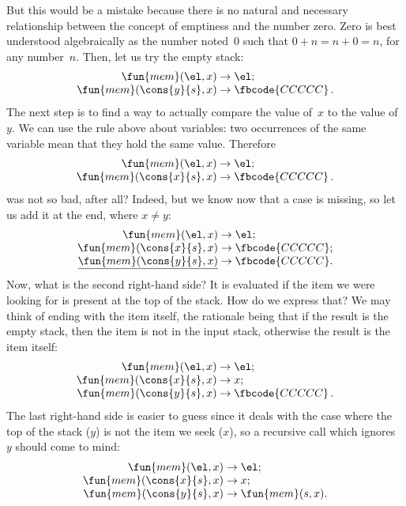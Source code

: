 But this would be a mistake because there is no natural and necessary
relationship between the concept of emptiness and the number
zero. Zero is best understood algebraically as the number noted~\(0\)
such that \(0 + n = n + 0 = n\), for any number~\(n\). Then, let us
try the empty stack:
\begin{equation*}
\begin{array}{r@{\;}c@{\;}l}
\fun{mem}(\el,x) & \rightarrow & \el;\\
\fun{mem}(\cons{y}{s},x) & \rightarrow & \fbcode{CCCCC}\,.
\end{array}
\end{equation*}
The next step is to find a way to actually compare the value of~\(x\)
to the value of~\(y\). We can use the rule above about variables: two
occurrences of the same variable mean that they hold the same
value. Therefore
\begin{equation*}
\begin{array}{r@{\;}c@{\;}l}
\fun{mem}(\el,x) & \rightarrow & \el;\\
\fun{mem}(\cons{x}{s},x) & \rightarrow & \fbcode{CCCCC}\,.
\end{array}
\end{equation*}
was not so bad, after all? Indeed, but we know now that a case is
missing, so let us add it at the end, where \(x \neq y\):
\begin{equation*}
\begin{array}{r@{\;}c@{\;}l}
\fun{mem}(\el,x) & \rightarrow & \el;\\
\fun{mem}(\cons{x}{s},x) & \rightarrow & \fbcode{CCCCC};\\
\underline{\fun{mem}(\cons{y}{s},x)} & \rightarrow & \fbcode{CCCCC}.
\end{array}
\end{equation*}
Now, what is the second right\hyp{}hand side? It is evaluated if the
item we were looking for is present at the top of the stack. How do we
express that? We may think of ending with the item itself, the
rationale being that if the result is the empty stack, then the item
is not in the input stack, otherwise the result is the item itself:
\begin{equation*}
\begin{array}{r@{\;}c@{\;}l}
\fun{mem}(\el,x) & \rightarrow & \el;\\
\fun{mem}(\cons{x}{s},x) & \rightarrow & x;\\
\fun{mem}(\cons{y}{s},x) & \rightarrow & \fbcode{CCCCC}\,.
\end{array}
\end{equation*}
The last right\hyp{}hand side is easier to guess since it deals with
the case where the top of the stack (\(y\)) is not the item we seek
(\(x\)), so a recursive call which ignores~\(y\) should come to mind:
\begin{equation*}
\begin{array}{r@{\;}c@{\;}l}
\fun{mem}(\el,x) & \rightarrow & \el;\\
\fun{mem}(\cons{x}{s},x) & \rightarrow & x;\\
\fun{mem}(\cons{y}{s},x) & \rightarrow & \fun{mem}(s,x).
\end{array}
\end{equation*}

